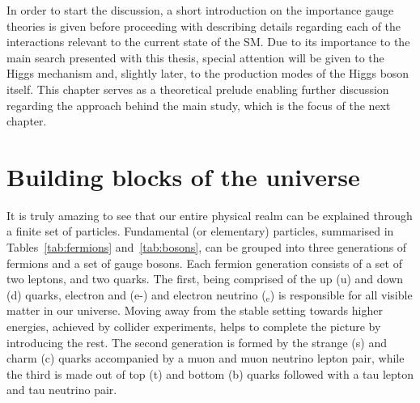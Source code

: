 \hspace{10pt} In order to start the discussion, a short introduction on the importance gauge theories is given before proceeding with describing details regarding each of the interactions relevant to the current state of the SM. Due to its importance to the main search presented with this thesis, special attention will be given to the Higgs mechanism and, slightly later, to the production modes of the Higgs boson itself. This chapter serves as a theoretical prelude enabling further discussion regarding the approach behind the main study, which is the focus of the next chapter.
\newpage
\section{Building blocks of the universe}
\hspace{10pt} It is truly amazing to see that our entire physical realm can be explained through a finite set of particles. Fundamental (or elementary) particles, summarised in Tables~\ref{tab:fermions} and~\ref{tab:bosons}, can be grouped into three generations of fermions and a set of gauge bosons. Each fermion generation consists of a set of two leptons, and two quarks. The first, being comprised of the up (u) and down (d) quarks, electron and (e-) and electron neutrino (\textnu$_\text{e}$) is responsible for all visible matter in our universe. Moving away from the stable setting towards higher energies, achieved by collider experiments, helps to complete the picture by introducing the rest. The second generation is formed by the strange (s) and charm (c) quarks accompanied by a muon and muon neutrino lepton pair, while the third is made out of top (t) and bottom (b) quarks followed with a tau lepton and tau neutrino pair.

